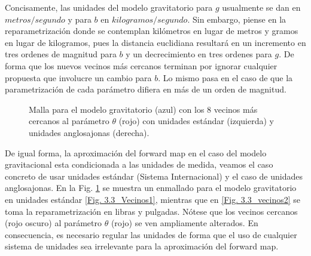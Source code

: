 Concisamente, las unidades del modelo gravitatorio para $g$ usualmente se dan en $metros/segundo$ y para $b$ en $kilogramos/segundo$. Sin embargo, piense en la reparametrización donde se contemplan kilómetros en lugar de metros y gramos en lugar de kilogramos, pues la distancia euclidiana resultará en un incremento en tres ordenes de magnitud para $b$ y un decrecimiento en tres ordenes para $g$. De forma que los nuevos vecinos más cercanos terminan por ignorar cualquier propuesta que involucre un cambio para $b$. Lo mismo pasa en el caso de que la parametrización de cada parámetro difiera en más de un orden de magnitud.

\begin{figure}
    \centering
    \qquad
    \caption{Malla para el modelo gravitatorio (azul) con los 8 vecinos más cercanos al parámetro $\theta$ (rojo) con unidades estándar (izquierda) y unidades anglosajonas (derecha).}
    \label{Vecinos}
\end{figure}

De igual forma, la aproximación del forward map en el caso del modelo gravitacional esta condicionada a las unidades de medida, veamos el caso concreto de usar unidades estándar (Sistema Internacional) y el caso de unidades anglosajonas. En la Fig. \ref{Vecinos} se muestra un enmallado para el modelo gravitatorio en unidades estándar \ref{Fig. 3.3_Vecinos1}, mientras que en \ref{Fig. 3.3_vecinos2} se toma la reparametrización en libras y pulgadas. Nótese que los vecinos cercanos (rojo oscuro) al parámetro $\theta$ (rojo) se ven ampliamente alterados. En consecuencia, es necesario regular las unidades de forma que el uso de cualquier sistema de unidades sea irrelevante para la aproximación del forward map.


